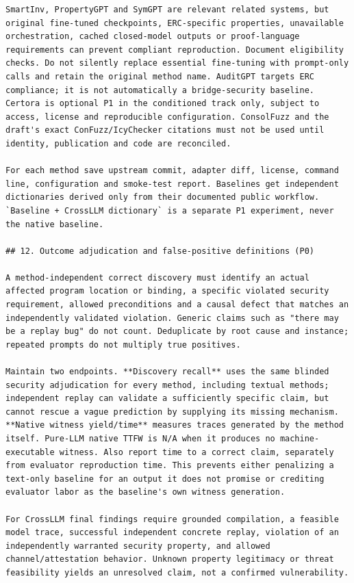\documentclass[11pt,a4paper]{article}
\begin{document}
\begin{verbatim}
SmartInv, PropertyGPT and SymGPT are relevant related systems, but original fine-tuned checkpoints, ERC-specific properties, unavailable orchestration, cached closed-model outputs or proof-language requirements can prevent compliant reproduction. Document eligibility checks. Do not silently replace essential fine-tuning with prompt-only calls and retain the original method name. AuditGPT targets ERC compliance; it is not automatically a bridge-security baseline. Certora is optional P1 in the conditioned track only, subject to access, license and reproducible configuration. ConsolFuzz and the draft's exact ConFuzz/IcyChecker citations must not be used until identity, publication and code are reconciled.

For each method save upstream commit, adapter diff, license, command line, configuration and smoke-test report. Baselines get independent dictionaries derived only from their documented public workflow. `Baseline + CrossLLM dictionary` is a separate P1 experiment, never the native baseline.

## 12. Outcome adjudication and false-positive definitions (P0)

A method-independent correct discovery must identify an actual affected program location or binding, a specific violated security requirement, allowed preconditions and a causal defect that matches an independently validated violation. Generic claims such as "there may be a replay bug" do not count. Deduplicate by root cause and instance; repeated prompts do not multiply true positives.

Maintain two endpoints. **Discovery recall** uses the same blinded security adjudication for every method, including textual methods; independent replay can validate a sufficiently specific claim, but cannot rescue a vague prediction by supplying its missing mechanism. **Native witness yield/time** measures traces generated by the method itself. Pure-LLM native TTFW is N/A when it produces no machine-executable witness. Also report time to a correct claim, separately from evaluator reproduction time. This prevents either penalizing a text-only baseline for an output it does not promise or crediting evaluator labor as the baseline's own witness generation.

For CrossLLM final findings require grounded compilation, a feasible model trace, successful independent concrete replay, violation of an independently warranted security property, and allowed channel/attestation behavior. Unknown property legitimacy or threat feasibility yields an unresolved claim, not a confirmed vulnerability.


\end{verbatim}
\end{document}
